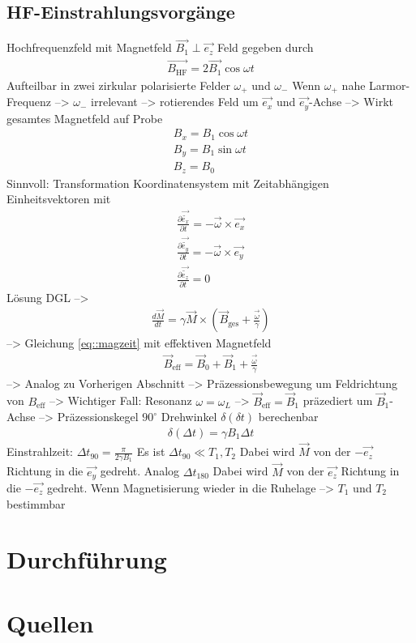 \documentclass[]{scrartcl}
\begin{document}
\subsection{HF-Einstrahlungsvorgänge}
Hochfrequenzfeld mit Magnetfeld $\vec{B_1} \perp \vec{e_z}$
Feld gegeben durch
\begin{align}
\vec{B_{\text{HF}}}=2\vec{B_1} \cos \omega t
\end{align}
Aufteilbar in zwei zirkular polarisierte Felder $\omega_+$ und $\omega_-$
Wenn $\omega_+$ nahe Larmor-Frequenz --> $\omega_-$ irrelevant
--> rotierendes Feld um $\vec{e_x}$ und $\vec{e_y}$-Achse
--> Wirkt gesamtes Magnetfeld auf Probe
\begin{align*}
B_x=B_1 \cos \omega t \\
B_y=B_1 \sin \omega t \\
B_z=B_0
\end{align*}
Sinnvoll: Transformation Koordinatensystem mit Zeitabhängigen Einheitsvektoren mit
\begin{align}
\frac{\partial \vec{\tilde{e_x}}}{\partial t}= -\vec{\omega} \times \vec{e_x}\\
\frac{\partial \vec{\tilde{e_y}}}{\partial t}= -\vec{\omega} \times \vec{e_y}\\
\frac{\partial \vec{\tilde{e_z}}}{\partial t}= 0
\end{align}
Lösung DGL 
--> 
\begin{align}
\frac{d \vec{M}}{d t}= \gamma \vec{M}\times \left(\vec{B}_{\text{ges}}+\frac{\vec{\omega}}{\gamma}\right)
\end{align}
--> Gleichung \ref{eq::magzeit} mit effektiven Magnetfeld
\begin{align}
\vec{B}_\text{eff}=\vec{B}_0+\vec{B}_1+\frac{\vec{\omega}}{\gamma}
\end{align}
--> Analog zu Vorherigen Abschnitt --> Präzessionsbewegung um Feldrichtung von $B_{\text{eff}}$
--> Wichtiger Fall: Resonanz $\omega=\omega_L$ --> $\vec{B}_{\text{eff}}=\vec{B}_1$
präzediert um $\vec{B}_1$-Achse --> Präzessionskegel $90^\circ$
Drehwinkel $\delta\left(\delta t\right)$ berechenbar
\begin{align}
\delta\left(\Delta t\right)=\gamma B_1 \Delta t
\end{align}
Einstrahlzeit:
$\Delta t_{90}=\frac{\pi}{2\gamma B_1} $
Es ist $\Delta t_{90} \ll T_1,T_2$
Dabei wird $\vec{M}$ von der $-\vec{e_z}$ Richtung in die  $\vec{e_y}$ gedreht.
Analog $\Delta t_{180}$ Dabei wird $\vec{M}$ von der $\vec{e_z}$ Richtung in die  $-\vec{e_z}$ gedreht. 
Wenn Magnetisierung wieder in die Ruhelage --> $T_1$ und $T_2$ bestimmbar

\section{Durchführung}


\section{Quellen}
\end{document}
